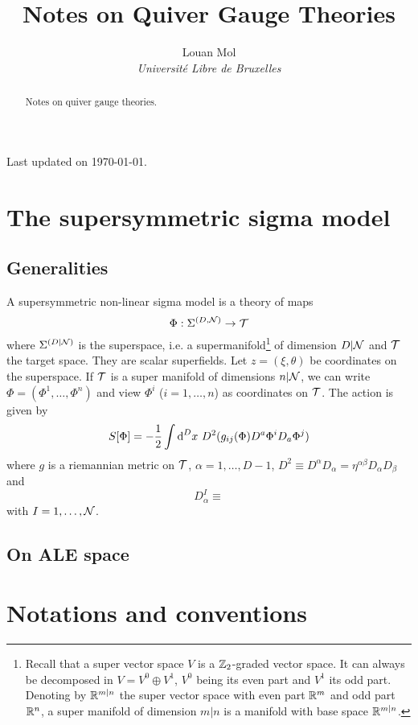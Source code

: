 \documentclass[a4paper,11pt]{article}
\title{Notes on Quiver Gauge Theories}
\author{Louan Mol\\ \textit{Université Libre de Bruxelles}}
\begin{document}
\maketitle

\vspace{2cm}

\begin{abstract}
    Notes on quiver gauge theories.
\end{abstract}

\tableofcontents

\vfill

Last updated on \today.
  
\pagebreak

\nocite{*}

\section{The supersymmetric sigma model}

    \subsection{Generalities}

        A supersymmetric non-linear sigma model is a theory of maps
        \begin{equation*}
            \Phi:\Sigma^{(D,\mathcal{N})}\to\mathcal{T}
        \end{equation*}
        where $\Sigma^{(D|\mathcal{N})}$ is the superspace, i.e. a supermanifold\footnote{Recall that a super vector space $V$ is a $\mathbb{Z}_2$-graded vector space. It can always be decomposed in $V=V^0\oplus V^1$, $V^0$ being its even part and $V^1$ its odd part. Denoting by $\mathbb{R}^{m|n}$ the super vector space with even part $\mathbb{R}^m$ and odd part $\mathbb{R}^n$, a super manifold of dimension $m|n$ is a manifold with base space $\mathbb{R}^{m|n}$.} of dimension $D|\mathcal{N}$ and $\mathcal{T}$ the target space. They are scalar superfields. Let $z=(\xi,\theta)$ be coordinates on the superspace. If $\mathcal{T}$ is a super manifold of dimensions $n|\mathcal{N}$, we can write $\Phi=(\Phi^1,\dots,\Phi^n)$ and view $\Phi^i$ ($i=1,\dots,n$) as coordinates on $\mathcal{T}$. The action is given by
        \begin{equation}
            S[\Phi]=-\frac{1}{2}\int\text{d}^Dx~D^2(g_{ij}(\Phi)D^a\Phi^iD_a\Phi^j)
        \end{equation}
        where $g$ is a riemannian metric on $\mathcal{T}$, $\alpha=1,\dots,D-1$, $D^2\equiv D^\alpha D_\alpha = \eta^{\alpha\beta}D_\alpha D_\beta$ and
        \begin{equation*}
            D^I_\alpha\equiv 
        \end{equation*}
        with $I=1,\dots,\mathcal{N}$.

    \subsection{On ALE space}


\pagebreak
\appendix

\section{Notations and conventions}


     

   

\pagebreak

\printbibliography
\end{document}
